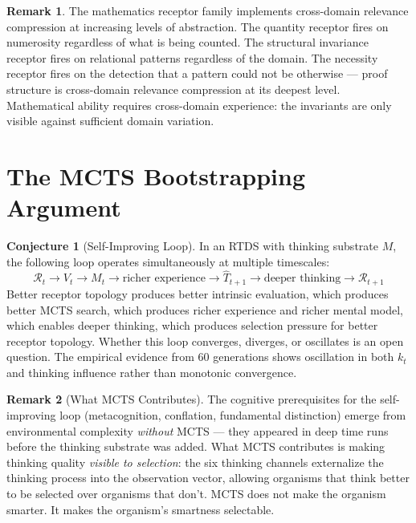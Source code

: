\documentclass[12pt]{article}
\theoremstyle{definition}
\newtheorem{remark}{Remark}
\newtheorem{conjecture}{Conjecture}
\begin{document}
\begin{remark}
The mathematics receptor family implements cross-domain relevance compression at
increasing levels of abstraction. The quantity receptor fires on numerosity regardless
of what is being counted. The structural invariance receptor fires on relational patterns
regardless of the domain. The necessity receptor fires on the detection that a pattern
could not be otherwise --- proof structure is cross-domain relevance compression at its
deepest level. Mathematical ability requires cross-domain experience: the invariants
are only visible against sufficient domain variation.
\end{remark}

\section{The MCTS Bootstrapping Argument}

\begin{conjecture}[Self-Improving Loop]
In an RTDS with thinking substrate $M$, the following loop operates simultaneously
at multiple timescales:
\[
\mathcal{R}_t \to V_t \to M_t \to \text{richer experience} \to \hat{T}_{t+1}
\to \text{deeper thinking} \to \mathcal{R}_{t+1}
\]
Better receptor topology produces better intrinsic evaluation, which produces better
MCTS search, which produces richer experience and richer mental model, which enables
deeper thinking, which produces selection pressure for better receptor topology.
Whether this loop converges, diverges, or oscillates is an open question. The empirical
evidence from 60 generations shows oscillation in both $k_t$ and thinking influence
rather than monotonic convergence.
\end{conjecture}

\begin{remark}[What MCTS Contributes]
The cognitive prerequisites for the self-improving loop (metacognition, conflation,
fundamental distinction) emerge from environmental complexity \emph{without} MCTS ---
they appeared in deep time runs before the thinking substrate was added. What MCTS
contributes is making thinking quality \emph{visible to selection}: the six thinking
channels externalize the thinking process into the observation vector, allowing
organisms that think better to be selected over organisms that don't. MCTS does not
make the organism smarter. It makes the organism's smartness selectable.
\end{remark}
\end{document}
